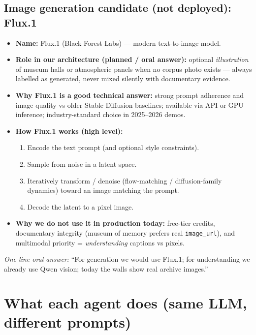 \documentclass[11pt,a4paper]{article}
\begin{document}
\subsection{Image generation candidate (not deployed): Flux.1}

\begin{itemize}[leftmargin=*]
  \item \textbf{Name:} Flux.1 (Black Forest Labs) --- modern text-to-image model.
  \item \textbf{Role in our architecture (planned / oral answer):} optional
        \emph{illustration} of museum halls or atmospheric panels when no corpus
        photo exists --- always labelled as generated, never mixed silently with
        documentary evidence.
  \item \textbf{Why Flux.1 is a good technical answer:} strong prompt adherence
        and image quality vs older Stable Diffusion baselines; available via API
        or GPU inference; industry-standard choice in 2025--2026 demos.
  \item \textbf{How Flux.1 works (high level):}
        \begin{enumerate}[nosep]
          \item Encode the text prompt (and optional style constraints).
          \item Sample from noise in a latent space.
          \item Iteratively transform / denoise (flow-matching / diffusion-family
                dynamics) toward an image matching the prompt.
          \item Decode the latent to a pixel image.
        \end{enumerate}
  \item \textbf{Why we do not use it in production today:} free-tier credits,
        documentary integrity (museum of memory prefers real \texttt{image\_url}),
        and multimodal priority = \emph{understanding} captions vs pixels.
\end{itemize}

\noindent\textit{One-line oral answer:}
``For generation we would use Flux.1; for understanding we already use Qwen vision;
today the walls show real archive images.''

\section{What each agent does (same LLM, different prompts)}
\end{document}
